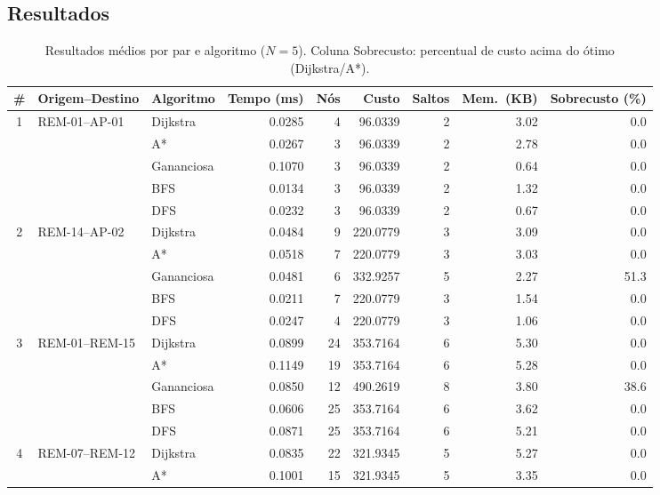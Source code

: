 \documentclass[conference]{IEEEtran}
\begin{document}
\subsection{Resultados}

\begin{table}[t]
\caption{Resultados médios por par e algoritmo ($N=5$). Coluna Sobrecusto: percentual de custo acima do ótimo (Dijkstra/A*).}
\label{tab:resultados}
\centering
\scriptsize
\begin{tabular}{cllrrrrrr}
\toprule
\# & Origem--Destino & Algoritmo & Tempo (ms) & Nós & Custo & Saltos & Mem.\ (KB) & Sobrecusto (\%) \\
\midrule
\multirow{5}{*}{1} & \multirow{5}{*}{REM-01--AP-01}
  & Dijkstra   & 0.0285 & 4  & 96.0339  & 2 & 3.02 & 0.0  \\
& & A*         & 0.0267 & 3  & 96.0339  & 2 & 2.78 & 0.0  \\
& & Gananciosa & 0.1070 & 3  & 96.0339  & 2 & 0.64 & 0.0  \\
& & BFS        & 0.0134 & 3  & 96.0339  & 2 & 1.32 & 0.0  \\
& & DFS        & 0.0232 & 3  & 96.0339  & 2 & 0.67 & 0.0  \\
\midrule
\multirow{5}{*}{2} & \multirow{5}{*}{REM-14--AP-02}
  & Dijkstra   & 0.0484 & 9  & 220.0779 & 3 & 3.09 &  0.0 \\
& & A*         & 0.0518 & 7  & 220.0779 & 3 & 3.03 &  0.0 \\
& & Gananciosa & 0.0481 & 6  & 332.9257 & 5 & 2.27 & 51.3 \\
& & BFS        & 0.0211 & 7  & 220.0779 & 3 & 1.54 &  0.0 \\
& & DFS        & 0.0247 & 4  & 220.0779 & 3 & 1.06 &  0.0 \\
\midrule
\multirow{5}{*}{3} & \multirow{5}{*}{REM-01--REM-15}
  & Dijkstra   & 0.0899 & 24 & 353.7164 & 6 & 5.30 &  0.0 \\
& & A*         & 0.1149 & 19 & 353.7164 & 6 & 5.28 &  0.0 \\
& & Gananciosa & 0.0850 & 12 & 490.2619 & 8 & 3.80 & 38.6 \\
& & BFS        & 0.0606 & 25 & 353.7164 & 6 & 3.62 &  0.0 \\
& & DFS        & 0.0871 & 25 & 353.7164 & 6 & 5.21 &  0.0 \\
\midrule
\multirow{5}{*}{4} & \multirow{5}{*}{REM-07--REM-12}
  & Dijkstra   & 0.0835 & 22 & 321.9345 & 5 & 5.27 & 0.0 \\
& & A*         & 0.1001 & 15 & 321.9345 & 5 & 3.35 & 0.0 \\

\end{tabular}
\end{table}
\end{document}
